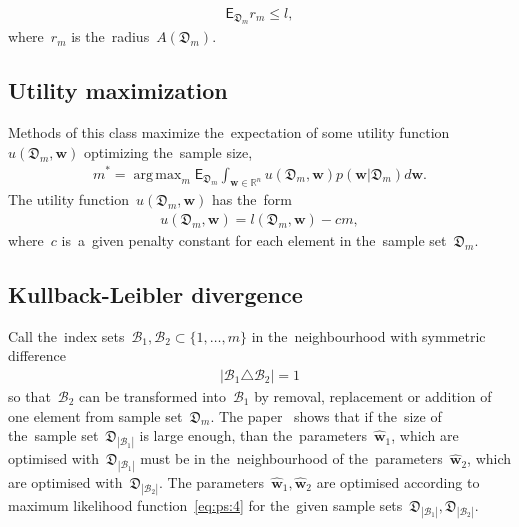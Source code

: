 \documentclass[
11pt,%
tightenlines,%
twoside,%
onecolumn,%
nofloats,%
nobibnotes,%
nofootinbib,%
superscriptaddress,%
noshowpacs,%
centertags]%
{revtex4}
\DeclareMathOperator*{\argmax}{arg\,max}
\begin{document}
\[
\label{eq:bs:5}
\begin{aligned}
	\mathsf{E}_{\mathfrak{D}_m}r_m\leq l,
\end{aligned}
\]
where~$r_m$ is the~radius~$A\left(\mathfrak{D}_{m}\right)$.

\subsection{Utility maximization}
Methods of this class maximize the~expectation of some utility function~$u\left(\mathfrak{D}_{m}, \mathbf{w}\right)$ optimizing the~sample size,
\[
\label{eq:bs:6}
\begin{aligned}
	m^* = \argmax_{m} \mathsf{E}_{\mathfrak{D}_m}\int_{\mathbf{w}\in\mathbb{R}^{n}}u\left(\mathfrak{D}_m, \mathbf{w}\right)p(\mathbf{w}|\mathfrak{D}_m)d\mathbf{w}.
\end{aligned}
\]
The utility function~$u\left(\mathfrak{D}_{m}, \mathbf{w}\right)$ has the~form
\[
\label{eq:bs:7}
\begin{aligned}
	u\left(\mathfrak{D}_m, \mathbf{w}\right) = l\left(\mathfrak{D}_m, \mathbf{w}\right) - cm,
\end{aligned}
\]
 where~$c$ is~a~given penalty constant for each element in the~sample set~$\mathfrak{D}_m$. 
	 
\subsection{Kullback-Leibler divergence}
Call the~index sets~$\mathcal{B}_1,\mathcal{B}_2 \subset \{1,\dots,m\}$ in the~neighbourhood with symmetric difference
\[
\label{eq:bs:8}
\begin{aligned}
	\left|\mathcal{B}_1 \triangle \mathcal{B}_2\right| = 1
\end{aligned}
\]
so that~$\mathcal{B}_2$ can be transformed into~$\mathcal{B}_1$ by removal, replacement or addition of one element from sample set~$\mathfrak{D}_m$. The paper~\cite{motrenko2014} shows that if the~size of the~sample set~$\mathfrak{D}_{|\mathcal{B}_1|}$ is large enough, than the~parameters~$\hat{\mathbf{w}}_1$, which are optimised with~$\mathfrak{D}_{|\mathcal{B}_1|}$ must be in the~neighbourhood of the~parameters~$\hat{\mathbf{w}}_2$, which are optimised with~$\mathfrak{D}_{|\mathcal{B}_2|}$. The parameters~$\hat{\mathbf{w}}_1, \hat{\mathbf{w}}_2$ are optimised according to maximum likelihood function~\eqref{eq:ps:4} for the~given sample sets~$\mathfrak{D}_{|\mathcal{B}_1|}, \mathfrak{D}_{|\mathcal{B}_2|}$.
	 
\end{document}
